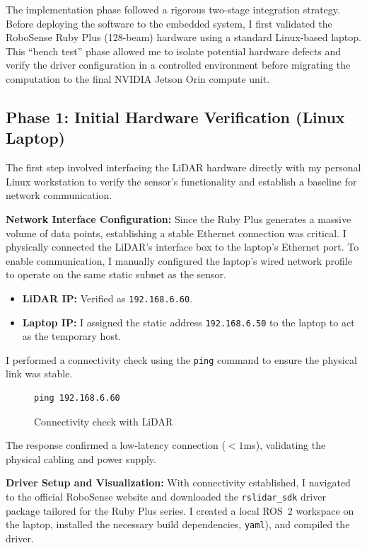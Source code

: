 \documentclass[12pt,a4paper]{report}
\begin{document}
The implementation phase followed a rigorous two-stage integration strategy. Before deploying the software to the embedded system, I first validated the RoboSense Ruby Plus (128-beam) hardware using a standard Linux-based laptop. This ``bench test'' phase allowed me to isolate potential hardware defects and verify the driver configuration in a controlled environment before migrating the computation to the final NVIDIA Jetson Orin compute unit.

\subsection{Phase 1: Initial Hardware Verification (Linux Laptop)}
The first step involved interfacing the LiDAR hardware directly with my personal Linux workstation to verify the sensor's functionality and establish a baseline for network communication.

\textbf{Network Interface Configuration:} Since the Ruby Plus generates a massive volume of data points, establishing a stable Ethernet connection was critical. I physically connected the LiDAR’s interface box to the laptop’s Ethernet port. To enable communication, I manually configured the laptop's wired network profile to operate on the same static subnet as the sensor.

\begin{itemize}
    \item \textbf{LiDAR IP:} Verified as \texttt{192.168.6.60}.
    \item \textbf{Laptop IP:} I assigned the static address \texttt{192.168.6.50} to the laptop to act as the temporary host.
\end{itemize}

I performed a connectivity check using the \texttt{ping} command to ensure the physical link was stable.

\begin{figure}[ht!]
    \centering
    \begin{verbatim}
ping 192.168.6.60
    \end{verbatim}
    \caption{Connectivity check with LiDAR}
    \label{fig:ping_check}
\end{figure}

The response confirmed a low-latency connection ($< 1$ms), validating the physical cabling and power supply.

\textbf{Driver Setup and Visualization:} With connectivity established, I navigated to the official RoboSense website and downloaded the \texttt{rslidar\_sdk} driver package tailored for the Ruby Plus series. I created a local ROS~2 workspace on the laptop, installed the necessary build dependencies, \texttt{yaml}), and compiled the driver.
\end{document}
